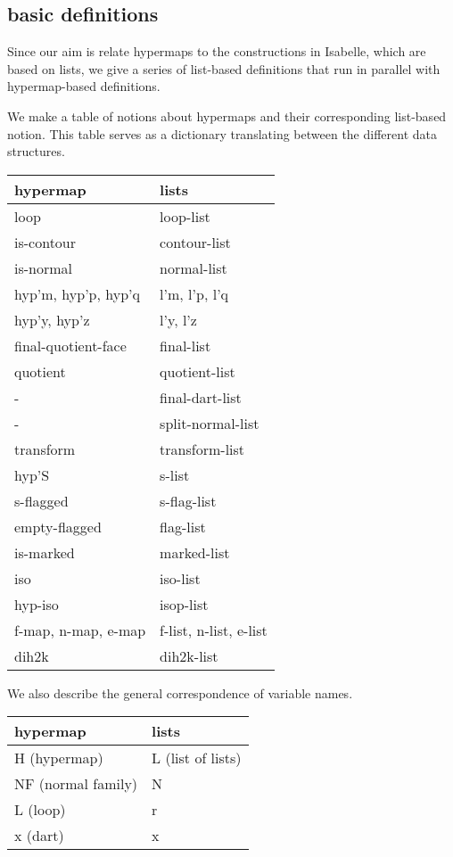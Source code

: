 \subsection{basic definitions}

Since our aim is relate hypermaps to the constructions in Isabelle, which
are based on lists, we give a series of list-based definitions that run
in parallel with hypermap-based definitions.

We make a table of notions about hypermaps and their corresponding list-based notion.
This table serves as a dictionary translating between the different data structures.

\bigskip
\begin{tabular}{l l}
\hline
{\bf hypermap} & {\bf lists} \\ \hline
loop & loop-list \\
is-contour & contour-list \\
is-normal & normal-list \\
hyp'm, hyp'p, hyp'q & l'm, l'p, l'q \\
hyp'y, hyp'z & l'y, l'z \\
final-quotient-face   & final-list \\
quotient & quotient-list \\
- & final-dart-list \\
- & split-normal-list \\
transform & transform-list \\
hyp'S & s-list \\
s-flagged & s-flag-list \\
empty-flagged & flag-list \\
is-marked & marked-list \\
iso & iso-list \\
hyp-iso & isop-list \\
f-map, n-map, e-map & f-list, n-list, e-list\\
dih2k & dih2k-list\\
\hline
\end{tabular}

\bigskip
We also describe the general correspondence of variable names.

\begin{tabular}{l l}
\hline
{\bf hypermap} & {\bf lists} \\ \hline
H (hypermap) & L (list of lists)\\
NF (normal family) & N \\
L (loop) & r \\
x (dart) & x \\
\hline
\end{tabular}

